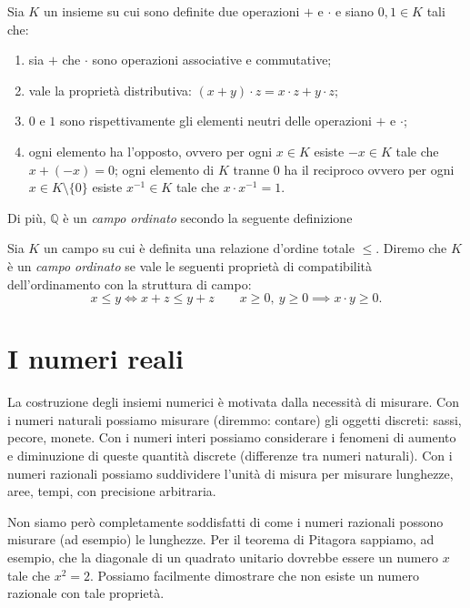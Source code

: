 \documentclass[italian,a4paper,hidelinks,headinclude]{scrartcl}
\newcommand{\QQ}{{\mathbb Q}}
\newcommand{\myemph}[1]{\emph{#1}\marginpar{#1}}
\begin{document}
\begin{definition}[campo]
  Sia $K$ un insieme su cui sono definite due operazioni $+$ e $\cdot$
  e siano $0,1 \in K$ tali che:
  \begin{enumerate}
    \item sia $+$ che $\cdot$ sono operazioni associative e commutative;
    \item vale la proprietà distributiva: $(x+y)\cdot z = x\cdot z + y\cdot z$;
    \item $0$ e $1$ sono rispettivamente gli elementi neutri delle operazioni $+$ e $\cdot$;
    \item ogni elemento ha l'opposto, ovvero per ogni $x\in K$ esiste $-x\in K$
    tale che $x+(-x) = 0$; ogni elemento di $K$ tranne $0$ ha il reciproco
    ovvero per ogni $x\in K\setminus\{0\}$ esiste $x^{-1}\in K$ tale che
    $x\cdot x^{-1}=1$.
  \end{enumerate}
\end{definition}

Di più, $\QQ$ è un \emph{campo ordinato} secondo la seguente definizione
\begin{definition}
  Sia $K$ un campo su cui è definita una relazione d'ordine totale $\le$.
  Diremo che $K$ è un \myemph{campo ordinato} se vale le seguenti
  proprietà di compatibilità dell'ordinamento con la struttura di campo:
  \[
    x \le y \iff x+z \le y+z \qquad
    x\ge 0,\ y \ge 0 \implies x\cdot y \ge 0.
  \]
\end{definition}

\section{I numeri reali}

La costruzione degli insiemi numerici è motivata dalla necessità di misurare.
Con i numeri naturali possiamo misurare (diremmo: contare) gli oggetti discreti:
sassi, pecore, monete. Con i numeri interi possiamo considerare i fenomeni di
aumento e diminuzione di queste quantità discrete (differenze tra numeri naturali).
Con i numeri razionali possiamo suddividere l'unità di misura per misurare
lunghezze, aree, tempi, con precisione arbitraria.

Non siamo però completamente soddisfatti di come i numeri razionali possono
misurare (ad esempio) le lunghezze. Per il teorema di Pitagora sappiamo,
ad esempio, che la diagonale di un quadrato unitario dovrebbe essere
un numero $x$ tale che $x^2=2$.
Possiamo facilmente dimostrare che non esiste un numero razionale
con tale proprietà.
\end{document}
